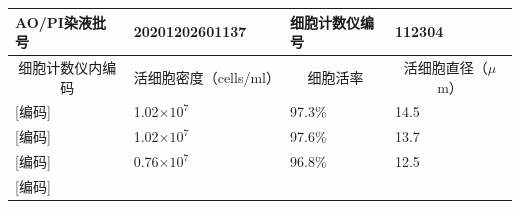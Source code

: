 \documentclass[UTF8,10pt,a4paper,fontset=fandol]{ctexart}
\newcommand{\fieldvalue}[1]{#1}
\newcommand{\handwritten}[1]{#1}
\begin{document}
\begin{tabularx}{\textwidth}{|p{4.0cm}|X|p{3.0cm}|X|}
\hline
AO/PI染液批号 &
\fieldvalue{\handwritten{20201202601137}} &
细胞计数仪编号 &
\fieldvalue{\handwritten{112304}}\\
\hline
\multicolumn{1}{|c|}{细胞计数仪内编码} &
\multicolumn{1}{c|}{活细胞密度（cells/ml）} &
\multicolumn{1}{c|}{细胞活率} &
\multicolumn{1}{c|}{活细胞直径（$\mu$m）} \\
\hline
\fieldvalue{\handwritten{[编码]}} &
\fieldvalue{\handwritten{1.02}}$\times10^7$ &
\fieldvalue{\handwritten{97.3}}\% &
\fieldvalue{\handwritten{14.5}}\\
\hline
\fieldvalue{\handwritten{[编码]}} &
\fieldvalue{\handwritten{1.02}}$\times10^7$ &
\fieldvalue{\handwritten{97.6}}\% &
\fieldvalue{\handwritten{13.7}}\\
\hline
\fieldvalue{\handwritten{[编码]}} &
\fieldvalue{\handwritten{0.76}}$\times10^7$ &
\fieldvalue{\handwritten{96.8}}\% &
\fieldvalue{\handwritten{12.5}}\\
\hline
\fieldvalue{\handwritten{[编码]}} &

\end{tabularx}
\end{document}
